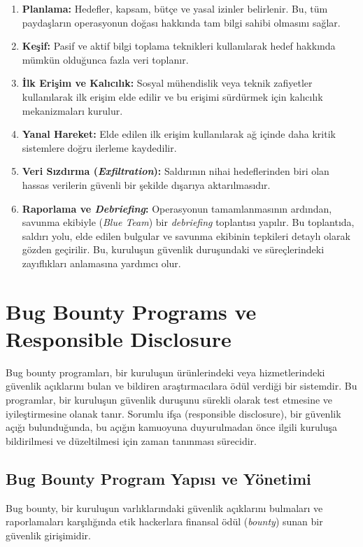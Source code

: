 \begin{enumerate}
\item \textbf{Planlama:} Hedefler, kapsam, bütçe ve yasal izinler belirlenir. Bu, tüm paydaşların operasyonun doğası hakkında tam bilgi sahibi olmasını sağlar.
\item \textbf{Keşif:} Pasif ve aktif bilgi toplama teknikleri kullanılarak hedef hakkında mümkün olduğunca fazla veri toplanır.
\item \textbf{İlk Erişim ve Kalıcılık:} Sosyal mühendislik veya teknik zafiyetler kullanılarak ilk erişim elde edilir ve bu erişimi sürdürmek için kalıcılık mekanizmaları kurulur.
\item \textbf{Yanal Hareket:} Elde edilen ilk erişim kullanılarak ağ içinde daha kritik sistemlere doğru ilerleme kaydedilir.
\item \textbf{Veri Sızdırma (\textit{Exfiltration}):} Saldırının nihai hedeflerinden biri olan hassas verilerin güvenli bir şekilde dışarıya aktarılmasıdır.
\item \textbf{Raporlama ve \textit{Debriefing}:} Operasyonun tamamlanmasının ardından, savunma ekibiyle (\textit{Blue Team}) bir \textit{debriefing} toplantısı yapılır. Bu toplantıda, saldırı yolu, elde edilen bulgular ve savunma ekibinin tepkileri detaylı olarak gözden geçirilir. Bu, kuruluşun güvenlik duruşundaki ve süreçlerindeki zayıflıkları anlamasına yardımcı olur.
\end{enumerate}

\section{Bug Bounty Programs ve Responsible Disclosure}

Bug bounty programları, bir kuruluşun ürünlerindeki veya hizmetlerindeki güvenlik açıklarını bulan ve bildiren araştırmacılara ödül verdiği bir sistemdir. Bu programlar, bir kuruluşun güvenlik duruşunu sürekli olarak test etmesine ve iyileştirmesine olanak tanır. Sorumlu ifşa (responsible disclosure), bir güvenlik açığı bulunduğunda, bu açığın kamuoyuna duyurulmadan önce ilgili kuruluşa bildirilmesi ve düzeltilmesi için zaman tanınması sürecidir.

\subsection{Bug Bounty Program Yapısı ve Yönetimi}

Bug bounty, bir kuruluşun varlıklarındaki güvenlik açıklarını bulmaları ve raporlamaları karşılığında etik hackerlara finansal ödül (\textit{bounty}) sunan bir güvenlik girişimidir.

